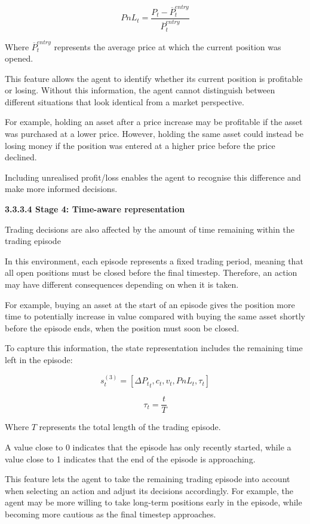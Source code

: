 \[PnL_{t} = \frac{P_{t} - {\overline{P}}_{t}^{entry}}{{\overline{P}}_{t}^{entry}}\]

Where \({\overline{P}}_{t}^{entry}\) represents the average price at
which the current position was opened.

This feature allows the agent to identify whether its current position
is profitable or losing. Without this information, the agent cannot
distinguish between different situations that look identical from a
market perspective.

For example, holding an asset after a price increase may be profitable
if the asset was purchased at a lower price. However, holding the same
asset could instead be losing money if the position was entered at a
higher price before the price declined.

Including unrealised profit/loss enables the agent to recognise this
difference and make more informed decisions.

\textbf{3.3.3.4 Stage 4: Time-aware representation}

Trading decisions are also affected by the amount of time remaining
within the trading episode

In this environment, each episode represents a fixed trading period,
meaning that all open positions must be closed before the final
timestep. Therefore, an action may have different consequences depending
on when it is taken.

For example, buying an asset at the start of an episode gives the
position more time to potentially increase in value compared with buying
the same asset shortly before the episode ends, when the position must
soon be closed.

To capture this information, the state representation includes the
remaining time left in the episode:

\[s_{t}^{(3)} = \left\lbrack {\Delta P_{t}}_{t},c_{t},v_{t},PnL_{t},\tau_{t} \right\rbrack\]

\[\tau_{t} = \frac{t}{T}\]

Where \(T\) represents the total length of the trading episode.

A value close to 0 indicates that the episode has only recently started,
while a value close to 1 indicates that the end of the episode is
approaching.

This feature lets the agent to take the remaining trading episode into
account when selecting an action and adjust its decisions accordingly.
For example, the agent may be more willing to take long-term positions
early in the episode, while becoming more cautious as the final timestep
approaches.

